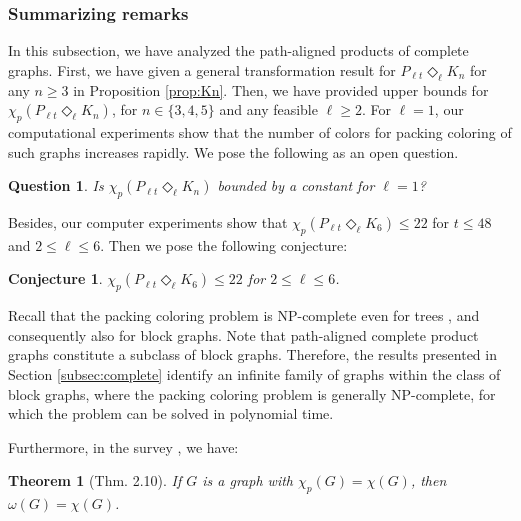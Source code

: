 \documentclass{article}
\newtheorem{question}{Question}
\newtheorem{conj}{Conjecture}
\newtheorem{theorem}{Theorem}
\begin{document}

\subsubsection{Summarizing remarks}

In this subsection, we have analyzed the path-aligned products of complete graphs. First, we have given a general transformation result for $P_{\ell t}\Diamond_{\ell} K_n$ for any $n\geq 3$ in Proposition \ref{prop:Kn}. Then, we have provided upper bounds for $\chi_p(P_{\ell t}\Diamond_{\ell} K_n)$, for $n \in \{3, 4, 5\}$ and any feasible $\ell \geq 2$. For $\ell =1$, our computational experiments show that the number of colors for packing coloring of such graphs increases rapidly. We pose the following as an open question.
\begin{question}
    Is $\chi_p(P_{\ell t}\Diamond_{\ell} K_n)$ bounded by a constant for $\ell=1$?
\end{question}


Besides, our computer experiments show that $\chi_p(P_{\ell t}\Diamond_{\ell} K_6) \le 22$ for $t \le 48$ and $2  \le \ell \le 6$. Then we pose the following conjecture:

\begin{conj}
    $\chi_p(P_{\ell t}\Diamond_{\ell} K_6) \le 22$ for $2  \le \ell \le 6$.
\end{conj}
    


Recall that the packing coloring problem is NP-complete even for trees \cite{fiala}, and consequently also for block graphs. Note that path-aligned complete product graphs constitute a subclass of block graphs. Therefore, the results presented in Section \ref{subsec:complete} identify an infinite family of graphs within the class of block graphs, where the packing coloring problem is generally NP-complete, for which the problem can be solved in polynomial time.

Furthermore, in the survey \cite{survey}, we have:

\begin{theorem}[Thm. 2.10]
If $G$ is a graph with $\chi_p(G)=\chi(G)$, then $\omega(G)=\chi(G)$.\label{thm:eq_chi}
\end{theorem}
\end{document}
